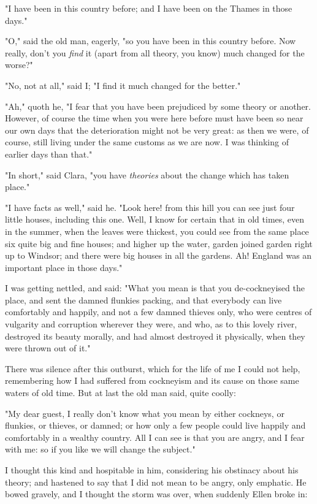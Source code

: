 "I have been in this country before; and I have been on the Thames in
those days."

"O," said the old man, eagerly, "so you have been in this country
before. Now really, don't you \emph{find} it (apart from all theory, you
know) much changed for the worse?"

"No, not at all," said I; "I find it much changed for the better."

"Ah," quoth he, "I fear that you have been prejudiced by some theory or
another. However, of course the time when you were here before must have
been so near our own days that the deterioration might not be very
great: as then we were, of course, still living under the same customs
as we are now. I was thinking of earlier days than that."

"In short," said Clara, "you have \emph{theories} about the change which
has taken place."

"I have facts as well," said he. "Look here! from this hill you can see
just four little houses, including this one. Well, I know for certain
that in old times, even in the summer, when the leaves were thickest,
you could see from the same place six quite big and fine houses; and
higher up the water, garden joined garden right up to Windsor; and there
were big houses in all the gardens. Ah! England was an important place
in those days."

I was getting nettled, and said: "What you mean is that you
de-cockneyised the place, and sent the damned flunkies packing, and that
everybody can live comfortably and happily, and not a few damned thieves
only, who were centres of vulgarity and corruption wherever they were,
and who, as to this lovely river, destroyed its beauty morally, and had
almost destroyed it physically, when they were thrown out of it."

There was silence after this outburst, which for the life of me I could
not help, remembering how I had suffered from cockneyism and its cause
on those same waters of old time. But at last the old man said, quite
coolly:

"My dear guest, I really don't know what you mean by either cockneys, or
flunkies, or thieves, or damned; or how only a few people could live
happily and comfortably in a wealthy country. All I can see is that you
are angry, and I fear with me: so if you like we will change the
subject."

I thought this kind and hospitable in him, considering his obstinacy
about his theory; and hastened to say that I did not mean to be angry,
only emphatic. He bowed gravely, and I thought the storm was over, when
suddenly Ellen broke in:

